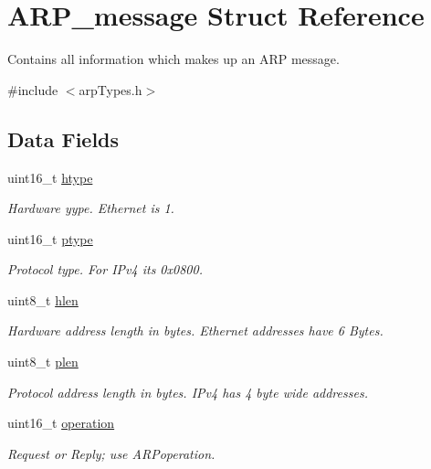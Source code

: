 \hypertarget{struct_a_r_p__message}{}\section{A\+R\+P\+\_\+message Struct Reference}
\label{struct_a_r_p__message}


Contains all information which makes up an A\+RP message.  




{\ttfamily \#include $<$arp\+Types.\+h$>$}

\subsection*{Data Fields}
\begin{DoxyCompactItemize}
\item 
uint16\+\_\+t \mbox{\hyperlink{struct_a_r_p__message_aaf87c38602b614bc7896cf7a5a90d372}{htype}}
\begin{DoxyCompactList}\small\item\em Hardware yype. Ethernet is 1. \end{DoxyCompactList}\item 
uint16\+\_\+t \mbox{\hyperlink{struct_a_r_p__message_ab4891e9b77eb26f33d21cfde982564cb}{ptype}}
\begin{DoxyCompactList}\small\item\em Protocol type. For I\+Pv4 it\textquotesingle{}s 0x0800. \end{DoxyCompactList}\item 
uint8\+\_\+t \mbox{\hyperlink{struct_a_r_p__message_aff25a69752648654e56c4ff3e0b1b226}{hlen}}
\begin{DoxyCompactList}\small\item\em Hardware address length in bytes. Ethernet addresses have 6 Bytes. \end{DoxyCompactList}\item 
uint8\+\_\+t \mbox{\hyperlink{struct_a_r_p__message_ae414f6c2299d9cf0eff8aa8e81f538d8}{plen}}
\begin{DoxyCompactList}\small\item\em Protocol address length in bytes. I\+Pv4 has 4 byte wide addresses. \end{DoxyCompactList}\item 
uint16\+\_\+t \mbox{\hyperlink{struct_a_r_p__message_ad21c763fa2f80cb8649108b759113b54}{operation}}
\begin{DoxyCompactList}\small\item\em Request or Reply; use A\+R\+Poperation. \end{DoxyCompactList}\item 

\end{DoxyCompactItemize}
